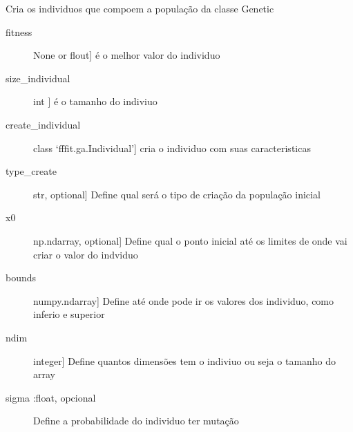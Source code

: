 \documentclass[letterpaper,10pt,english]{sphinxmanual}
\begin{document}
\begin{fulllineitems}
\label{\detokenize{index:ga.Individual}}
Cria os individuos que compoem a população da classe Genetic
\begin{description}
\item[{fitness}] \leavevmode{[}None or flout{]}
é o melhor valor do individuo

\item[{size\_individual}] \leavevmode{[}int {]}
é o tamanho do indiviuo

\item[{create\_individual}] \leavevmode{[}class ‘fffit.ga.Individual’{]}
cria o individuo com suas caracteristicas

\end{description}
\begin{description}
\item[{type\_create}] \leavevmode{[}str, optional{]}
Define qual será o tipo de criação da população inicial

\item[{x0}] \leavevmode{[}np.ndarray, optional{]}
Define qual o ponto inicial até os limites de onde vai criar o valor do indviduo

\item[{bounds}] \leavevmode{[}numpy.ndarray{]}
Define até onde pode ir os valores dos individuo, como inferio e superior

\item[{ndim}] \leavevmode{[}integer{]}
Define quantos dimensões tem o indiviuo ou seja o tamanho do array

\item[{sigma :float, opcional}] \leavevmode
Define a probabilidade do individuo ter mutação

\end{description}


\end{fulllineitems}
\end{document}
